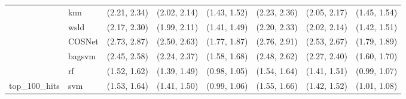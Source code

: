 \begin{table}[H]
{\begin{tabular}{llllllll}
 & knn & (2.21, 2.34) & (2.02, 2.14) & (1.43, 1.52) & (2.23, 2.36) & (2.05, 2.17) & (1.45, 1.54)\\

 & wsld & (2.17, 2.30) & (1.99, 2.11) & (1.41, 1.49) & (2.20, 2.33) & (2.02, 2.14) & (1.42, 1.51)\\

 & COSNet & (2.73, 2.87) & (2.50, 2.63) & (1.77, 1.87) & (2.76, 2.91) & (2.53, 2.67) & (1.79, 1.89)\\

 & bagsvm & (2.45, 2.58) & (2.24, 2.37) & (1.58, 1.68) & (2.48, 2.62) & (2.27, 2.40) & (1.60, 1.70)\\

 & rf & (1.52, 1.62) & (1.39, 1.49) & (0.98, 1.05) & (1.54, 1.64) & (1.41, 1.51) & (0.99, 1.07)\\

\multirow{-15}{*}{\raggedright\arraybackslash top\_100\_hits} & svm & (1.53, 1.64) & (1.41, 1.50) & (0.99, 1.06) & (1.55, 1.66) & (1.42, 1.52) & (1.01, 1.08)\\
\bottomrule
\end{tabular}}
\end{table}
